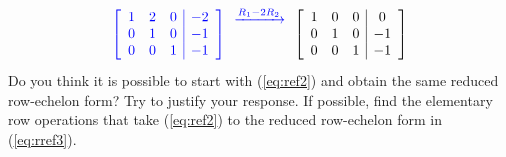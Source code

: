 \documentclass{ximera}
\begin{document}
\begin{exploration}
$$\begin{array}{c}
\\
 \end{array}$$
\begin{equation}\label{eq:rref3}  \color{blue}
 \left[\begin{array}{ccc|c} 
 1&2&0&-2\\0&1&0&-1\\0&0&1&-1
 \end{array}\right]
  \begin{array}{c}
  \xrightarrow{R_1-2R_2}\\
 \\
\\
 \end{array}
 \color{black}
  \left[\begin{array}{ccc|c} 
 1&0&0&0\\0&1&0&-1\\0&0&1&-1
 \end{array}\right]\end{equation}
Do you think it is possible to start with (\ref{eq:ref2}) and obtain the same reduced row-echelon form?  Try to justify your response.  If possible, find the elementary row operations that take (\ref{eq:ref2}) to the reduced row-echelon form in (\ref{eq:rref3}).
 

\end{exploration}
\end{document}
